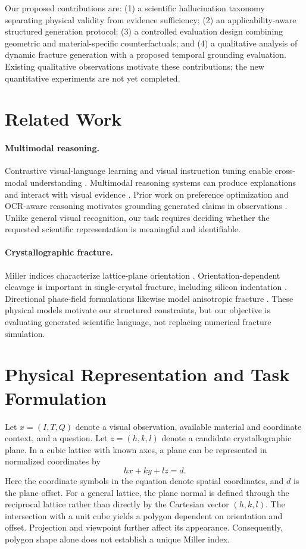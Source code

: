 \documentclass[11pt]{article}
\begin{document}
Our proposed contributions are: (1) a scientific hallucination taxonomy separating physical validity from evidence sufficiency; (2) an applicability-aware structured generation protocol; (3) a controlled evaluation design combining geometric and material-specific counterfactuals; and (4) a qualitative analysis of dynamic fracture generation with a proposed temporal grounding evaluation. Existing qualitative observations motivate these contributions; the new quantitative experiments are not yet completed.
\section{Related Work}
\paragraph{Multimodal reasoning.} Contrastive visual-language learning and visual instruction tuning enable cross-modal understanding \citep{radford2021,liu2023}. Multimodal reasoning systems can produce explanations and interact with visual evidence \citep{yang2023,gpt4,gemini}. Prior work on preference optimization and OCR-aware reasoning motivates grounding generated claims in observations \citep{xu2026,xuetal2026}. Unlike general visual recognition, our task requires deciding whether the requested scientific representation is meaningful and identifiable.
\paragraph{Crystallographic fracture.} Miller indices characterize lattice-plane orientation \citep{cullity2001}. Orientation-dependent cleavage is important in single-crystal fracture, including silicon indentation \citep{skalka2021,wasmer2005}. Directional phase-field formulations likewise model anisotropic fracture \citep{clayton2015,shanthraj2017}. These physical models motivate our structured constraints, but our objective is evaluating generated scientific language, not replacing numerical fracture simulation.
\section{Physical Representation and Task Formulation}
Let $x=(I,T,Q)$ denote a visual observation, available material and coordinate context, and a question. Let $z=(h,k,l)$ denote a candidate crystallographic plane. In a cubic lattice with known axes, a plane can be represented in normalized coordinates by
\begin{equation} hx+ky+lz=d. \end{equation}
Here the coordinate symbols in the equation denote spatial coordinates, and $d$ is the plane offset. For a general lattice, the plane normal is defined through the reciprocal lattice rather than directly by the Cartesian vector $(h,k,l)$.
The intersection with a unit cube yields a polygon dependent on orientation and offset. Projection and viewpoint further affect its appearance. Consequently, polygon shape alone does not establish a unique Miller index.
\end{document}
